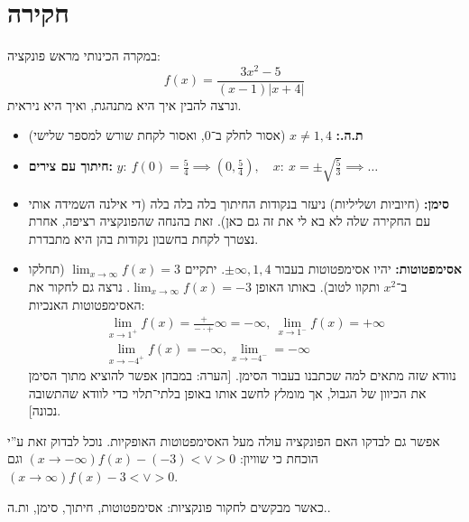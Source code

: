 \documentclass[]{article}
\newcommand\limi  {\lim_{x \to \infty}}
\renewcommand\inf {\infty}
\begin{document}
	\section{חקירה}
	במקרה הכינותי מראש פונקציה: 
	\[ f(x) = \dfrac{3x^2 - 5}{(x - 1)|x + 4|} \]
	ונרצה להבין איך היא מתנהגת, ואיך היא ניראית. 
	\begin{itemize}
		\item \textbf{ת.ה.: }$x \neq 1, 4$ (אסור לחלק ב־0, ואסור לקחת שורש למספר שלישי)
		\item \textbf{חיתוך עם צירים: }$y: \ f(0) = \frac{5}{4} \implies (0, \frac{5}{4}), \quad x: \ x = \pm\sqrt{\frac{5}{3}} \implies \dots$
		\item \textbf{סימן: }(חיוביות ושליליות) ניעזר בנקודות החיתוך בלה בלה בלה (די אילנה השמידה אותי עם החקירה שלה לא בא לי את זה גם כאן). זאת בהנחה שהפונקציה רציפה, אחרת נצטרך לקחת בחשבון נקודות בהן היא מתבדרת. 
		\item \textbf{אסימפטוטות: }יהיו אסימפטוטות בעבור $\pm \inf, 1, 4$. יתקיים $\limi f(x) = 3$ (תחלקו ב־$x^2$ ותקוו לטוב). באותו האופן $\limi f(x) = -3$. נרצה גם לחקור את האסימפטוטות האנכיות: 
		\begin{gather}
			\lim_{x \to 1^+} f(x) = \frac{+}{- \cdot +}\inf = -\inf, \ \lim_{x \to 1^-} f(x) = +\inf \\
			\lim_{x \to -4^+} f(x) = - \inf, \lim_{x \to -4^-} = -\inf
		\end{gather}
		נוודא שזה מתאים למה שכתבנו בעבור הסימן. [הערה: במבחן אפשר להוציא מתוך הסימן את הכיוון של הגבול, אך מומלץ לחשב אותו באופן בלתי־תלוי כדי לוודא שהתשובה נכונה]. 
	\end{itemize}
	אפשר גם לבדקו האם הפונקציה עולה מעל האסימפטוטות האופקיות. נוכל לבדוק זאת ע''י הוכחת כי שוויון: $(x \to -\inf) f(x) - (-3) < \lor > 0 $ וגם $(x \to \inf) f(x) - 3 < \lor > 0 $. 
	
	כאשר מבקשים לחקור פונקציות: אסימפטוטות, חיתוך, סימן, ות.ה.. 
	
	
	
\end{document}
